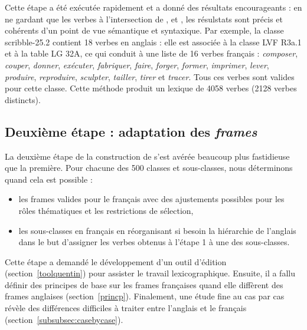 Cette étape a été exécutée rapidement et a donné des résultats encourageants :
en ne gardant que les verbes à l'intersection de \Ltrad{}, \Clvf{} et \Clg{},
les résulstats sont précis et cohérents d'un point de vue sémantique et
syntaxique. Par exemple, la classe {\color{blue}scribble-25.2} contient 18
verbes en anglais : elle est associée à la classe LVF {\color{red}R3a.1} et à
la table LG {\color{green}32A}, ce qui conduit à une liste de 16 verbes
français : \emph{composer}, \emph{couper}, \emph{donner}, \emph{exécuter},
\emph{fabriquer}, \emph{faire}, \emph{forger}, \emph{former}, \emph{imprimer},
\emph{lever}, \emph{produire}, \emph{reproduire}, \emph{sculpter},
\emph{tailler}, \emph{tirer} et \emph{tracer}. Tous ces verbes sont valides
pour cette classe.  Cette méthode produit un lexique de 4058 verbes (2128
verbes distincts).


\subsection{Deuxième étape : adaptation des \emph{frames}}\label{second}

La deuxième étape de la construction de \verbenet{} s'est avérée beaucoup plus
fastidieuse que la première. Pour chacune des 500 classes et sous-classes, nous
déterminons quand cela est possible :

\begin{itemize}

    \item les frames valides pour le français avec des ajustements possibles
        pour les rôles thématiques et les restrictions de sélection,

    \item les sous-classes en français en réorganisant si besoin la hiérarchie
        de l'anglais dans le but d'assigner les verbes obtenus à l'étape 1 à
        une des sous-classes.

\end{itemize}

Cette étape a demandé le développement d'un outil d'édition
(section~\ref{toolquentin}) pour assister le travail lexicographique. Ensuite,
il a fallu définir des principes de base sur les frames françaises quand elle
diffèrent des frames anglaises (section~\ref{princp}). Finalement, une étude
fine au cas par cas révèle des différences difficiles à traiter entre l'anglais
et le français (section~\ref{subsubsec:casebycase}).

